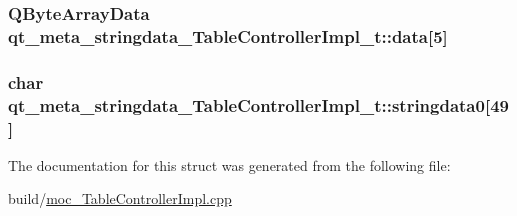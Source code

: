 \subsubsection[{\texorpdfstring{data}{data}}]{\setlength{\rightskip}{0pt plus 5cm}Q\+Byte\+Array\+Data qt\+\_\+meta\+\_\+stringdata\+\_\+\+Table\+Controller\+Impl\+\_\+t\+::data\mbox{[}5\mbox{]}}\hypertarget{structqt__meta__stringdata___table_controller_impl__t_abf949a0469f361c0c90653150fc8d0b3}{}\label{structqt__meta__stringdata___table_controller_impl__t_abf949a0469f361c0c90653150fc8d0b3}
\subsubsection[{\texorpdfstring{stringdata0}{stringdata0}}]{\setlength{\rightskip}{0pt plus 5cm}char qt\+\_\+meta\+\_\+stringdata\+\_\+\+Table\+Controller\+Impl\+\_\+t\+::stringdata0\mbox{[}49\mbox{]}}\hypertarget{structqt__meta__stringdata___table_controller_impl__t_ad671611e780842223ffc0eb77564b446}{}\label{structqt__meta__stringdata___table_controller_impl__t_ad671611e780842223ffc0eb77564b446}


The documentation for this struct was generated from the following file\+:\begin{DoxyCompactItemize}
\item 
build/\hyperlink{moc___table_controller_impl_8cpp}{moc\+\_\+\+Table\+Controller\+Impl.\+cpp}\end{DoxyCompactItemize}
